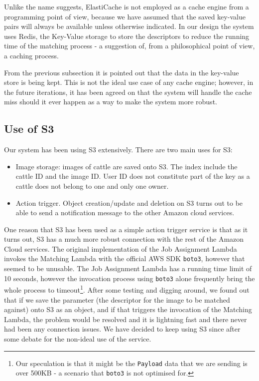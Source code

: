 Unlike the name suggests, ElastiCache is not employed as a cache engine from a programming point of view, because we have assumed that the saved key-value pairs will always be available unless otherwise indicated. In our design the system uses Redis, the Key-Value storage to store the descriptors to reduce the running time of the matching process - a suggestion of, from a philosophical point of view, a caching process.

From the previous subsection it is pointed out that the data in the key-value store is being kept. This is not the ideal use case of any cache engine; however, in the future iterations, it has been agreed on that the system will handle the cache miss should it ever happen as a way to make the system more robust.

\subsection{Use of S3}

Our system has been using S3 extensively. There are two main uses for S3:

\begin{itemize}
	\item Image storage: images of cattle are saved onto S3. The index include the cattle ID and the image ID. User ID does not constitute part of the key as a cattle does not belong to one and only one owner.
	\item Action trigger. Object creation/update and deletion on S3 turns out to be able to send a notification message to the other Amazon cloud services.
\end{itemize}

One reason that S3 has been used as a simple action trigger service is that as it turns out, S3 has a much more robust connection with the rest of the Amazon Cloud services. The original implementation of the Job Assignment Lambda invokes the Matching Lambda with the official AWS SDK \texttt{boto3}, however that seemed to be unusable. The Job Assignment Lambda has a running time limit of 10 seconds, however the invocation process using \texttt{boto3} alone frequently bring the whole process to timeout\footnote{Our speculation is that it might be the \texttt{Payload} data that we are sending is over 500KB - a scenario that \texttt{boto3} is not optimised for.}. After some testing and digging around, we found out that if we save the parameter (the descriptor for the image to be matched against) onto S3 as an object, and if that triggers the invocation of the Matching Lambda, the problem would be resolved and it is lightning fast and there never had been any connection issues. We have decided to keep using S3 since after some debate for the non-ideal use of the service.

